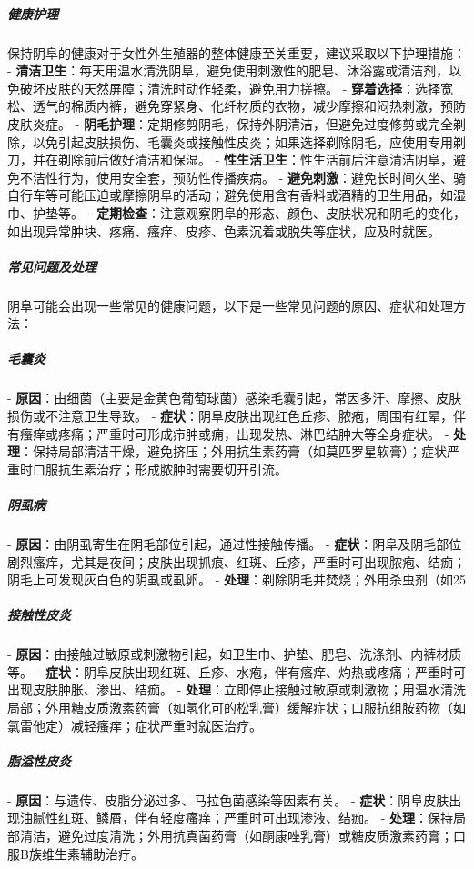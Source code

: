 \begin{enumerate}
\subparagraph{健康护理}
保持阴阜的健康对于女性外生殖器的整体健康至关重要，建议采取以下护理措施：
- \textbf{清洁卫生}：每天用温水清洗阴阜，避免使用刺激性的肥皂、沐浴露或清洁剂，以免破坏皮肤的天然屏障；清洗时动作轻柔，避免用力搓擦。
- \textbf{穿着选择}：选择宽松、透气的棉质内裤，避免穿紧身、化纤材质的衣物，减少摩擦和闷热刺激，预防皮肤炎症。
- \textbf{阴毛护理}：定期修剪阴毛，保持外阴清洁，但避免过度修剪或完全剃除，以免引起皮肤损伤、毛囊炎或接触性皮炎；如果选择剃除阴毛，应使用专用剃刀，并在剃除前后做好清洁和保湿。
- \textbf{性生活卫生}：性生活前后注意清洁阴阜，避免不洁性行为，使用安全套，预防性传播疾病。
- \textbf{避免刺激}：避免长时间久坐、骑自行车等可能压迫或摩擦阴阜的活动；避免使用含有香料或酒精的卫生用品，如湿巾、护垫等。
- \textbf{定期检查}：注意观察阴阜的形态、颜色、皮肤状况和阴毛的变化，如出现异常肿块、疼痛、瘙痒、皮疹、色素沉着或脱失等症状，应及时就医。

\subparagraph{常见问题及处理}
阴阜可能会出现一些常见的健康问题，以下是一些常见问题的原因、症状和处理方法：

\subparagraph{毛囊炎}
- \textbf{原因}：由细菌（主要是金黄色葡萄球菌）感染毛囊引起，常因多汗、摩擦、皮肤损伤或不注意卫生导致。
- \textbf{症状}：阴阜皮肤出现红色丘疹、脓疱，周围有红晕，伴有瘙痒或疼痛；严重时可形成疖肿或痈，出现发热、淋巴结肿大等全身症状。
- \textbf{处理}：保持局部清洁干燥，避免挤压；外用抗生素药膏（如莫匹罗星软膏）；症状严重时口服抗生素治疗；形成脓肿时需要切开引流。

\subparagraph{阴虱病}
- \textbf{原因}：由阴虱寄生在阴毛部位引起，通过性接触传播。
- \textbf{症状}：阴阜及阴毛部位剧烈瘙痒，尤其是夜间；皮肤出现抓痕、红斑、丘疹，严重时可出现脓疱、结痂；阴毛上可发现灰白色的阴虱或虱卵。
- \textbf{处理}：剃除阴毛并焚烧；外用杀虫剂（如25%

\subparagraph{接触性皮炎}
- \textbf{原因}：由接触过敏原或刺激物引起，如卫生巾、护垫、肥皂、洗涤剂、内裤材质等。
- \textbf{症状}：阴阜皮肤出现红斑、丘疹、水疱，伴有瘙痒、灼热或疼痛；严重时可出现皮肤肿胀、渗出、结痂。
- \textbf{处理}：立即停止接触过敏原或刺激物；用温水清洗局部；外用糖皮质激素药膏（如氢化可的松乳膏）缓解症状；口服抗组胺药物（如氯雷他定）减轻瘙痒；症状严重时就医治疗。

\subparagraph{脂溢性皮炎}
- \textbf{原因}：与遗传、皮脂分泌过多、马拉色菌感染等因素有关。
- \textbf{症状}：阴阜皮肤出现油腻性红斑、鳞屑，伴有轻度瘙痒；严重时可出现渗液、结痂。
- \textbf{处理}：保持局部清洁，避免过度清洗；外用抗真菌药膏（如酮康唑乳膏）或糖皮质激素药膏；口服B族维生素辅助治疗。


\end{enumerate}
